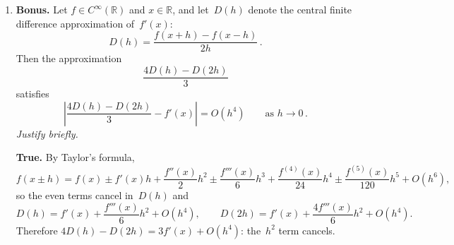 \documentclass[a4paper]{article}
\newcommand{\answer}[1]{%
    \ifdefined\showsolutions
        \par\smallskip
        {\small\color{blue!60!black}#1\par}
    \fi
}
\begin{document}
\begin{enumerate}
    \item \textbf{Bonus.}
        Let $f \in C^{\infty}(\mathbb R)$ and $x \in \mathbb R$,
        and let~$D(h)$ denote the central finite difference approximation of~$f'(x)$:
        \[
            D(h) = \frac{f(x + h) - f(x - h)}{2h}\,.
        \]
        Then the approximation
        \[
            \frac{4 D(h) - D(2h)}{3}
        \]
        satisfies
        \[
            \left\lvert \frac{4 D(h) - D(2h)}{3} - f'(x) \right\rvert = O(h^4) \qquad \text{as } h \to 0\,.
        \]
        \emph{Justify briefly.}
        \answer{\textbf{True.}
        By Taylor's formula,
        \[
            f(x \pm h) = f(x) \pm f'(x) h + \frac{f''(x)}{2} h^2 \pm \frac{f'''(x)}{6} h^3 + \frac{f^{(4)}(x)}{24} h^4 \pm \frac{f^{(5)}(x)}{120} h^5 + O(h^6),
        \]
        so the even terms cancel in~$D(h)$ and
        \[
            D(h) = f'(x) + \frac{f'''(x)}{6} h^2 + O(h^4),
            \qquad
            D(2h) = f'(x) + \frac{4 f'''(x)}{6} h^2 + O(h^4).
        \]
        Therefore $4 D(h) - D(2h) = 3 f'(x) + O(h^4)$: the~$h^2$ term cancels.}
\end{enumerate}
\end{document}
